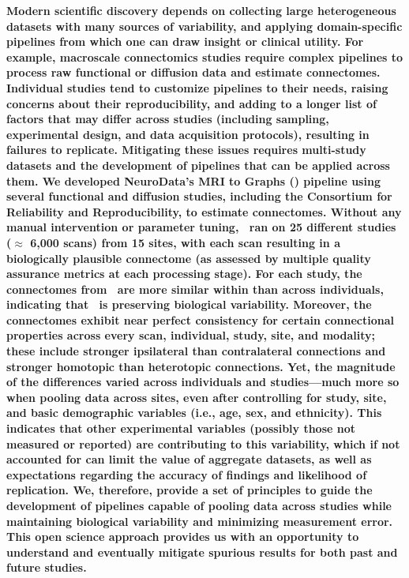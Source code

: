 \documentclass[11pt]{article}
\begin{document}
\noindent
\textbf{Modern scientific discovery depends on collecting large heterogeneous datasets with many sources of variability, and applying domain-specific pipelines from which one can draw  insight or clinical utility. For example, macroscale connectomics studies require complex pipelines to process raw functional or diffusion data and estimate connectomes. Individual studies tend to customize pipelines to their needs, raising concerns about their reproducibility,  and adding to a longer list of factors that may differ across studies (including sampling, experimental design, and data acquisition protocols), resulting in failures to replicate. Mitigating these issues requires multi-study datasets and the development of pipelines that can be applied across them. We developed NeuroData's MRI to Graphs (\ndmg) pipeline using several functional and diffusion studies, including the Consortium for Reliability and Reproducibility, to estimate connectomes. Without any manual intervention or parameter tuning, \ndmg~ran on 25 different studies ($\approx$ 6,000 scans) from 15 sites,  with each scan resulting in a biologically plausible connectome (as assessed by multiple quality assurance metrics at each processing stage). For each study, the connectomes from \ndmg~are more similar within than across individuals, indicating that \ndmg~is preserving biological variability. Moreover, the connectomes exhibit near perfect consistency for certain connectional properties across every scan, individual, study, site, and modality; these include stronger ipsilateral than contralateral connections and stronger homotopic than heterotopic connections. 
Yet, the magnitude of the differences varied across individuals and studies---much more so when pooling data across sites, even after controlling for study, site, and basic demographic variables (i.e., age, sex, and ethnicity). This indicates that other experimental variables (possibly those not measured or reported) are contributing to this variability, which if not accounted for can limit the value of aggregate datasets, as well as expectations regarding the accuracy of findings and likelihood of replication. We, therefore, provide a set of principles to guide the development of pipelines capable of pooling data across studies while maintaining biological variability and minimizing measurement error. This open science approach provides us with an opportunity to understand and eventually mitigate spurious results for both past and future studies.
}
\end{document}
